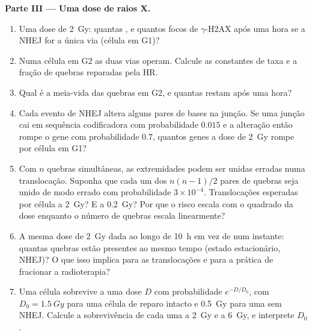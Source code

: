 \begin{problem}
\medskip
\noindent\textbf{Parte III --- Uma dose de raios X.}
\begin{enumerate}[resume]
  \item Uma dose de \qty{2}{Gy}: quantas , e
        quantos focos de $\gamma$-H2AX após uma hora se a NHEJ for a
        única via (célula em G1)?
  \item Numa célula em G2 as duas vias operam. Calcule as constantes
        de taxa e a fração de quebras reparadas pela HR.
  \item Qual é a meia-vida das quebras em G2, e quantas restam após
        uma hora?
  \item Cada evento de NHEJ altera alguns pares de bases na junção. Se
        uma junção cai em sequência codificadora com probabilidade
        $0.015$ e a alteração então rompe o gene com probabilidade
        $0.7$, quantos genes a dose de \qty{2}{Gy} rompe por célula em
        G1?
  \item Com $n$ quebras simultâneas, as extremidades podem ser unidas
        erradas numa translocação. Suponha que cada um dos $n(n-1)/2$
        pares de quebras seja unido de modo errado com probabilidade
        $3\times 10^{-4}$. Translocações esperadas por célula a
        \qty{2}{Gy}? E a \qty{0.2}{Gy}? Por que o risco escala com o
        quadrado da dose enquanto o número de quebras escala
        linearmente?
  \item A mesma dose de \qty{2}{Gy} dada ao longo de \qty{10}{h} em
        vez de num instante: quantas quebras estão presentes ao mesmo
        tempo (estado estacionário, NHEJ)? O que isso implica para as
        translocações e para a prática de fracionar a radioterapia?
  \item Uma célula sobrevive a uma dose $D$ com probabilidade
        $e^{-D/D_{0}}$, com $D_{0} = \qty{1.5}{Gy}$ para uma célula de
        reparo intacto e \qty{0.5}{Gy} para uma sem NHEJ. Calcule a
        sobrevivência de cada uma a \qty{2}{Gy} e a \qty{6}{Gy}, e
        interprete $D_{0}$.
\end{enumerate}


\end{problem}
